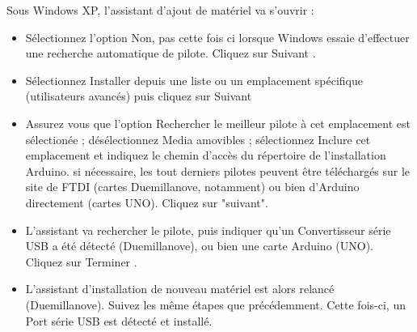 \documentclass[french]{etoys-guide}
\begin{document}
Sous Windows XP, l'assistant d'ajout de matériel va s'ouvrir :

\begin{itemize}
        \item 

                Sélectionnez l'option \og Non, pas cette fois ci \fg lorsque Windows
                essaie d'effectuer une recherche automatique de pilote. Cliquez sur \og
                Suivant \fg.
        
        \item 

                Sélectionnez \og Installer depuis une liste ou un emplacement
                spécifique (utilisateurs avancés) \fg puis cliquez sur \og Suivant \fg


        \item

                Assurez vous que l'option \og Rechercher le meilleur pilote à cet
                emplacement \fg est sélectionée ; désélectionnez \og Media amovibles
                \fg; sélectionnez \og Inclure cet emplacement \fg et indiquez le chemin
                d'accès du répertoire  de l'installation
                Arduino.  si nécessaire, les tout derniers pilotes peuvent être
                téléchargés sur le site de FTDI (cartes Duemillanove, notamment) ou
                bien d'Arduino directement (cartes UNO).  Cliquez sur "suivant".
        
        \item

                L'assistant va rechercher le pilote, puis indiquer qu'un \og
                Convertisseur série USB \fg a été détecté (Duemillanove), ou bien une
                carte Arduino (UNO). Cliquez sur \og Terminer \fg.
        
        \item
                L'assistant d'installation de nouveau matériel est alors relancé
                (Duemillanove). Suivez les même étapes que précédemment. Cette fois-ci,
                un \og Port série USB \fg est détecté et installé.

\end{itemize}
\end{document}

